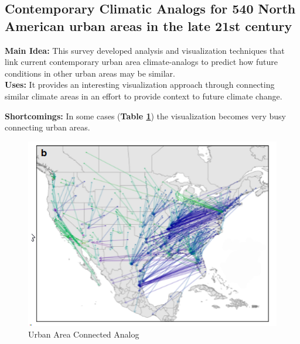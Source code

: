 \documentclass[sigconf,nonacm=true]{acmart}
\begin{document}
\subsection{Contemporary Climatic Analogs for 540 North American urban areas in the late 21st century \cite[Page Count:~7]{Comfort_4_FitzpatrickMatthew2019Ccaf}}
\textbf{Main Idea:} This survey developed analysis and visualization techniques that link current contemporary urban area climate-analogs to predict how future conditions in other urban areas may be similar.\\

\textbf{Uses:} It provides an interesting visualization approach through connecting similar climate areas in an effort to provide context to future climate change.  

\textbf{Shortcomings:} In some cases (\textbf{Table \ref{fig:connectedAnalog}}) the visualization becomes very busy connecting urban areas.\\
\begin{figure}[H]
	\centering
	\includegraphics[width=0.9\linewidth]{images/connectedAnalog}
	\caption{Urban Area Connected Analog \protect\cite{Comfort_4_FitzpatrickMatthew2019Ccaf}}
	\label{fig:connectedAnalog}
\end{figure}
\end{document}
